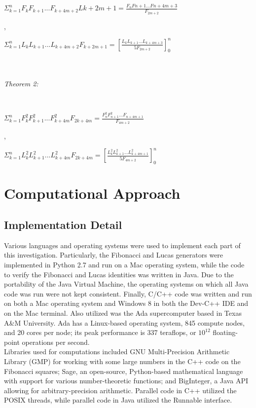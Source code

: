 \documentclass[11pt]{article}
\begin{document}
\\\begin{theorem}
$\Sigma_{k=1}^{n} F_{k}F_{k+1}...F_{k+4m+2}L{k+2m+1} = \frac{F_{n}F{n+1}...F{n+4m+3}}{F_{2m+2}}$
\end{theorem},\\

\begin{theorem}
$\Sigma_{k=1}^{n} L_{k}L_{k+1}...L_{k+4m+2}F_{k+2m+1}=[\frac{L_{k}L_{k+1}...L_{k+4m+3}}{5F_{2m+2}}]_{0}^n$
\end{theorem}\\ \\

\textit{Theorem 2:}

\\\begin{theorem}
$\Sigma_{k=1}^n F_{k}^2F_{k+1}^2...F_{k+4m}^2F_{2k+4m}=\frac{F_{n}^2F_{n+1}^2...F_{n+4m+1}}{F_{4m+2}}$
\end{theorem},\\

\begin{theorem}
$\Sigma_{k=1}^n L_{k}^2L_{k+1}^2...L_{k+4m}^2F_{2k+4m}=[\frac{L_{k}^2L_{k+1}^2...L_{k+4m+1}^2}{5F_{4m+2}}]_{0}^n$
\end{theorem}



\section{Computational Approach}
\subsection{Implementation Detail}
Various languages and operating systems were used to implement each part of this investigation. Particularly, the Fibonacci and Lucas generators were implemented in Python 2.7 and run on a Mac operating system, while the code to verify the Fibonacci and Lucas identities was written in Java. Due to the portability of the Java Virtual Machine, the operating systems on which all Java code was run were not kept consistent. Finally, C/C++ code was written and run on both a Mac operating system and Windows 8 in both the Dev-C++ IDE and on the Mac terminal. Also utilized was the Ada supercomputer based in Texas A\&M University. Ada has a Linux-based operating system, 845 compute nodes, and 20 cores per node; its peak performance is 337 teraflops, or $10^{12}$ floating-point operations per second. \\
Libraries used for computations included GNU Multi-Precision Arithmetic Library (GMP) for working with some large numbers in the C++ code on the Fibonacci squares; Sage, an open-source, Python-based mathematical language with support for various number-theoretic functions; and BigInteger, a Java API allowing for arbitrary-precision arithmetic. Parallel code in C++ utilized the POSIX threads, while parallel code in Java utilized the Runnable interface.
\end{document}
